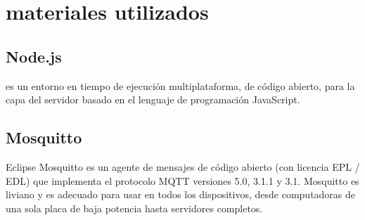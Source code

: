 \section{materiales utilizados}
\subsection{Node.js}
es un entorno en tiempo de ejecución multiplataforma, de código abierto, para la capa del servidor basado en el lenguaje de programación JavaScript.
\subsection{Mosquitto}
Eclipse Mosquitto es un agente de mensajes de código abierto (con licencia EPL / EDL) que implementa el protocolo MQTT versiones 5.0, 3.1.1 y 3.1. Mosquitto es liviano y es adecuado para usar en todos los dispositivos, desde computadoras de una sola placa de baja potencia hasta servidores completos.
